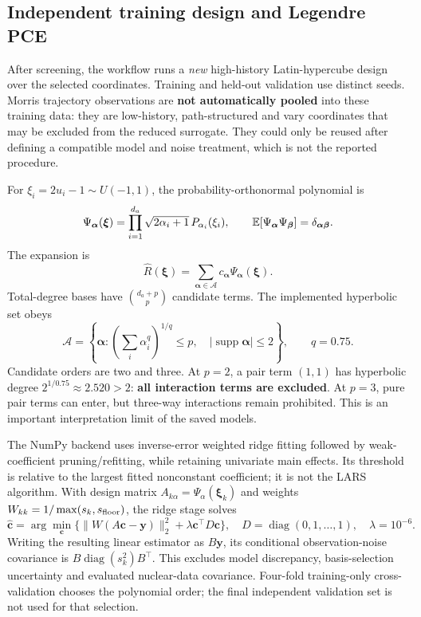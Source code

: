 \subsection{Independent training design and Legendre PCE}
After screening, the workflow runs a \emph{new} high-history Latin-hypercube design over the selected coordinates. Training and held-out validation use distinct seeds. Morris trajectory observations are \textbf{not automatically pooled} into these training data: they are low-history, path-structured and vary coordinates that may be excluded from the reduced surrogate. They could only be reused after defining a compatible model and noise treatment, which is not the reported procedure.

For $\xi_i=2u_i-1\sim U(-1,1)$, the probability-orthonormal polynomial is
\begin{equation}
\Psi_{\bm\alpha}(\bm\xi)=\prod_{i=1}^{d_a}\sqrt{2\alpha_i+1}\,P_{\alpha_i}(\xi_i),\qquad
\mathbb{E}[\Psi_{\bm\alpha}\Psi_{\bm\beta}]=\delta_{\bm\alpha\bm\beta}.
\end{equation}
The expansion is \citep{sudret,blatman}
\begin{equation}
\widehat R(\bm\xi)=\sum_{\bm\alpha\in\mathcal A}c_{\bm\alpha}\Psi_{\bm\alpha}(\bm\xi).\label{eq:pce}
\end{equation}
Total-degree bases have $\binom{d_a+p}{p}$ candidate terms. The implemented hyperbolic set obeys
\begin{equation}
\mathcal A=\left\{\bm\alpha:\left(\sum_i\alpha_i^q\right)^{1/q}\le p,\quad
|\operatorname{supp}\bm\alpha|\le2\right\},\qquad q=0.75.\label{eq:basis}
\end{equation}
Candidate orders are two and three. At $p=2$, a pair term $(1,1)$ has hyperbolic degree $2^{1/0.75}\approx2.520>2$: \textbf{all interaction terms are excluded}. At $p=3$, pure pair terms can enter, but three-way interactions remain prohibited. This is an important interpretation limit of the saved models.

The NumPy backend uses inverse-error weighted ridge fitting followed by weak-coefficient pruning/refitting, while retaining univariate main effects. Its threshold is relative to the largest fitted nonconstant coefficient; it is not the LARS algorithm. With design matrix $A_{k\alpha}=\Psi_\alpha(\bm\xi_k)$ and weights $W_{kk}=1/\max(s_k,s_{\rm floor})$, the ridge stage solves
\begin{equation}
\widehat{\bm c}=\arg\min_{\bm c}\{\|W(A\bm c-\bm y)\|_2^2+\lambda\bm c^\top D\bm c\},\quad D=\operatorname{diag}(0,1,\ldots,1),\quad\lambda=10^{-6}.\label{eq:wls}
\end{equation}
Writing the resulting linear estimator as $B\bm y$, its conditional observation-noise covariance is $B\operatorname{diag}(s_k^2)B^\top$. This excludes model discrepancy, basis-selection uncertainty and evaluated nuclear-data covariance. Four-fold training-only cross-validation chooses the polynomial order; the final independent validation set is not used for that selection.

